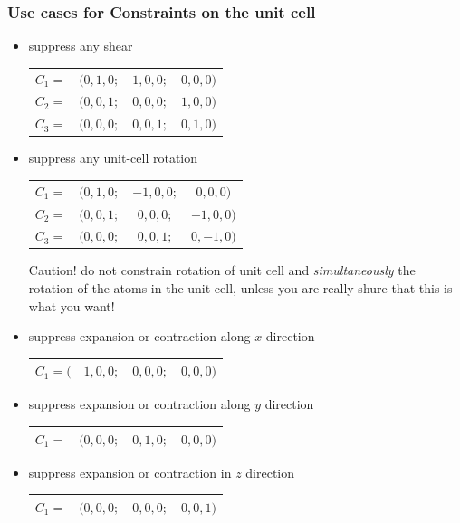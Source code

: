 \documentclass[final,12pt,makeidx,DIV=calc]{article}
\begin{document}
{{{%
\subsubsection{Use cases for Constraints on the unit cell}
\label{sec:usecasecellconstr}
\begin{itemize}
    \item suppress any shear
\begin{center}
\begin{tabular}{|cccc|}
\hline
$C_1=$&$(0,1,0;$&$ 1,0,0 ;$&$ 0,0,0)$\\
$C_2=$&$(0,0,1;$&$ 0,0,0 ;$&$ 1,0,0)$\\
$C_3=$&$(0,0,0;$&$ 0,0,1 ;$&$ 0,1,0)$\\
\hline
\end{tabular}
\end{center}
%
\item suppress any unit-cell rotation\\
\begin{center}
\begin{tabular}{|cccc|}
\hline
$C_1=$&$(0,1,0;$&$ -1,0,0;$&$ 0,0,0)$\\
$C_2=$&$(0,0,1;$&$ 0,0,0 ;$&$ -1,0,0)$\\
$C_3=$&$(0,0,0;$&$ 0,0,1 ;$&$ 0,-1,0)$\\
\hline
\end{tabular}
\end{center}
Caution! do not constrain rotation of unit cell and
\textit{simultaneously} the rotation of the atoms in the unit cell,
unless you are really shure that this is what you want!
%
\item suppress expansion or contraction along $x$ direction
\begin{center}
\begin{tabular}{|cccc|}
\hline
$C_1=($&$1,0,0;$&$ 0,0,0 ;$&$ 0,0,0)$\\
\hline
\end{tabular}
\end{center}
%
\item suppress expansion or contraction along $y$ direction
\begin{center}
\begin{tabular}{|cccc|}
\hline
$C_1=$&$(0,0,0;$&$ 0,1,0 ;$&$ 0,0,0)$\\
\hline
\end{tabular}
\end{center}
%
\item suppress expansion or contraction in $z$ direction
\begin{center}
\begin{tabular}{|cccc|}
\hline
$C_1=$&$(0,0,0;$&$ 0,0,0 ;$&$ 0,0,1)$\\
\hline
\end{tabular}
\end{center}
%
\end{itemize}

}}}
\end{document}

